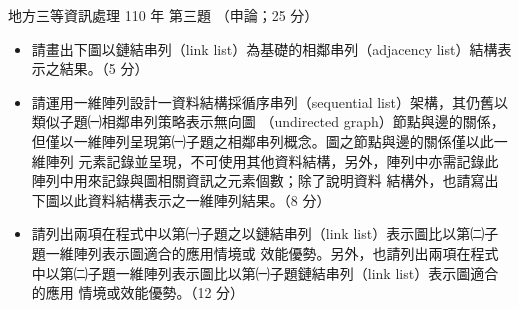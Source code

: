 \begin{pastexam}[label={px:df3-110-ds-03}]{地方三等資訊處理 110 年 第三題}
（申論；25 分）

\begin{itemize}[leftmargin=2.2em]
\item[㈠] 請畫出下圖以鏈結串列（link list）為基礎的相鄰串列（adjacency list）結構表示之結果。（5 分）
\item[㈡] 請運用一維陣列設計一資料結構採循序串列（sequential list）架構，其仍舊以類似子題㈠相鄰串列策略表示無向圖
（undirected graph）節點與邊的關係，但僅以一維陣列呈現第㈠子題之相鄰串列概念。圖之節點與邊的關係僅以此一維陣列
元素記錄並呈現，不可使用其他資料結構，另外，陣列中亦需記錄此陣列中用來記錄與圖相關資訊之元素個數；除了說明資料
結構外，也請寫出下圖以此資料結構表示之一維陣列結果。（8 分）
\item[㈢] 請列出兩項在程式中以第㈠子題之以鏈結串列（link list）表示圖比以第㈡子題一維陣列表示圖適合的應用情境或
效能優勢。另外，也請列出兩項在程式中以第㈡子題一維陣列表示圖比以第㈠子題鏈結串列（link list）表示圖適合的應用
情境或效能優勢。（12 分）
\end{itemize}
\begin{center}
\end{center}
\end{pastexam}

